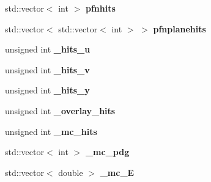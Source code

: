 \begin{DoxyCompactItemize}
\item 
\hypertarget{classanalysis_1_1DefaultAnalysis_a8d010c569e35c153059a6db573b9542d}{std\-::vector$<$ int $>$ {\bfseries pfnhits}}\label{classanalysis_1_1DefaultAnalysis_a8d010c569e35c153059a6db573b9542d}

\item 
\hypertarget{classanalysis_1_1DefaultAnalysis_a868edc3f02a7f71619edef7ee0d3df5c}{std\-::vector$<$ std\-::vector$<$ int $>$ $>$ {\bfseries pfnplanehits}}\label{classanalysis_1_1DefaultAnalysis_a868edc3f02a7f71619edef7ee0d3df5c}

\item 
\hypertarget{classanalysis_1_1DefaultAnalysis_a71d00d09f361b64c3b8491f1f83db0f9}{unsigned int {\bfseries \-\_\-hits\-\_\-u}}\label{classanalysis_1_1DefaultAnalysis_a71d00d09f361b64c3b8491f1f83db0f9}

\item 
\hypertarget{classanalysis_1_1DefaultAnalysis_a0d34f0785933a50dd9692651610b65c5}{unsigned int {\bfseries \-\_\-hits\-\_\-v}}\label{classanalysis_1_1DefaultAnalysis_a0d34f0785933a50dd9692651610b65c5}

\item 
\hypertarget{classanalysis_1_1DefaultAnalysis_a30b699a515887188545764f63babb58d}{unsigned int {\bfseries \-\_\-hits\-\_\-y}}\label{classanalysis_1_1DefaultAnalysis_a30b699a515887188545764f63babb58d}

\item 
\hypertarget{classanalysis_1_1DefaultAnalysis_aa4e3c702d047e53f6838d1655b12877a}{unsigned int {\bfseries \-\_\-overlay\-\_\-hits}}\label{classanalysis_1_1DefaultAnalysis_aa4e3c702d047e53f6838d1655b12877a}

\item 
\hypertarget{classanalysis_1_1DefaultAnalysis_aaaba27518c55c8797bbff0649cc48a8b}{unsigned int {\bfseries \-\_\-mc\-\_\-hits}}\label{classanalysis_1_1DefaultAnalysis_aaaba27518c55c8797bbff0649cc48a8b}

\item 
\hypertarget{classanalysis_1_1DefaultAnalysis_a5266889bcb108bee88f2de9a096139fc}{std\-::vector$<$ int $>$ {\bfseries \-\_\-mc\-\_\-pdg}}\label{classanalysis_1_1DefaultAnalysis_a5266889bcb108bee88f2de9a096139fc}

\item 
\hypertarget{classanalysis_1_1DefaultAnalysis_a5a4b7cd8b1c041d748d0f79f9454a497}{std\-::vector$<$ double $>$ {\bfseries \-\_\-mc\-\_\-\-E}}\label{classanalysis_1_1DefaultAnalysis_a5a4b7cd8b1c041d748d0f79f9454a497}


\end{DoxyCompactItemize}
